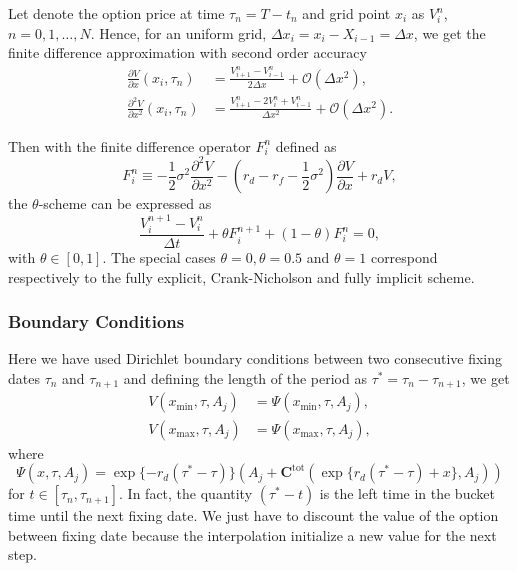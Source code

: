 Let denote the option price at time $\tau_n = T-t_n$ and grid point $x_i$ as $V_i^n$, $n=0,1,\ldots, N$. Hence, for an uniform grid, $\Delta x_i = x_i-X_{i-1} = \Delta x$, we get the finite difference approximation with second order accuracy 
\begin{align*}
\frac{\partial V}{\partial x}(x_i,\tau_n) &= \frac{V^n_{i+1}-V^n_{i-1}}{2\Delta x}+\mathcal{O}(\Delta x^2),\\
\frac{\partial^2 V}{\partial x^2}(x_i,\tau_n) &= \frac{V^n_{i+1}-2V_i^n+V^n_{i-1}}{\Delta x^2}+\mathcal{O}(\Delta x^2).
\end{align*}

Then with the finite difference operator $F_i^n$ defined as
$$F_i^n \equiv -\frac{1}{2}\sigma^2\frac{\partial^2 V}{\partial x^2}-\left(r_d - r_f - \frac{1}{2}\sigma^2\right)\frac{\partial V}{\partial x}+r_d V,$$
the $\theta$-scheme can be expressed as
$$\frac{V_i^{n+1}-V_i^n}{\Delta t}+\theta F_i^{n+1} +(1-\theta)F_i^n=0,$$
with $\theta\in[0,1]$. The special cases $\theta=0,\theta=0.5$ and $\theta=1$ correspond respectively to the fully explicit, Crank-Nicholson and fully implicit scheme.

\subsubsection{Boundary Conditions}
Here we have used Dirichlet boundary conditions between two consecutive fixing dates $\tau_{n}$ and $\tau_{n+1}$ and defining the length of the period as $\tau^\ast = \tau_{n}-\tau_{n+1}$, we get
\begin{align*}
V(x_{\min},\tau,A_j) &= \Psi(x_{\min},\tau,A_j),\\
V(x_{\max},\tau,A_j) &= \Psi(x_{\max},\tau,A_j),
\end{align*}
where 
$$ \Psi(x,\tau,A_j) = \exp\{-r_d (\tau^\ast-\tau)\}\left(A_j + \mathbf{C}^\text{tot}(\exp\{r_d (\tau^\ast-\tau) + x\},A_j)\right)$$
for $t\in[\tau_n,\tau_{n+1}]$. In fact, the quantity $(\tau^\ast-t)$ is the left time in the bucket time until the next fixing date. We just have to discount the value of the option between fixing date because the interpolation initialize a new value for the next step.

